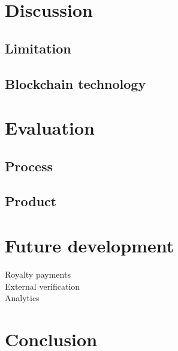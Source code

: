 \documentclass[12pt]{article}
\begin{document}
\section{Discussion}
\subsection{Limitation}

\subsection{Blockchain technology}

\section{Evaluation}
\subsection{Process}

\subsection{Product}

\section{Future development}

\begin{description}
	\item[Royalty payments]
	\item[External verification]
	\item[Analytics]
\end{description}

\section{Conclusion}




\end{document}
